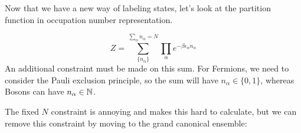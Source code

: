 \documentclass[a4paper,twoside,master.tex]{subfiles}
\begin{document}

Now that we have a new way of labeling states, let's look at the partition function in occupation number representation.

\begin{equation}
    Z = \sum_{\{n_{\alpha}\}}^{\sum_{\alpha} n_{\alpha} = N} \prod_{\alpha} e^{- \beta \epsilon_{\alpha} n_{\alpha}}
\end{equation}
An additional constraint must be made on this sum. For Fermions, we need to consider the Pauli exclusion principle, so the sum will have $ n_{\alpha} \in \{0,1\} $, whereas Bosons can have $ n_{\alpha} \in \mathbb{N} $.


The fixed $ N $ constraint is annoying and makes this hard to calculate, but we can remove this constraint by moving to the grand canonical ensemble:
\end{document}
